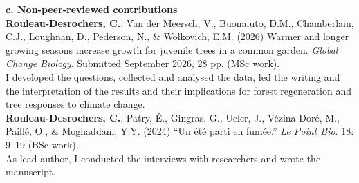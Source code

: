 \documentclass[12pt]{article}
\begin{document}
\textbf{c. Non-peer-reviewed contributions} \\[1pt]
\textbf{Rouleau-Desrochers, C.}, Van der Meersch, V., Buonaiuto, D.M., Chamberlain, C.J., Loughnan, D., Pederson, N., \& Wolkovich, E.M. (2026) Warmer and longer growing seasons increase growth for juvenile trees in a common garden. \textit{Global Change Biology}. Submitted September 2026, 28 pp. (MSc work). \\
I developed the questions, collected and analysed the data, led the writing and the interpretation of the results and their implications for forest regeneration and tree responses to climate change. \\[1pt]

\textbf{Rouleau-Desrochers, C.}, Patry, É., Gingras, G., Ucler, J., Vézina-Doré, M., Paillé, O., \& Moghaddam, Y.Y. (2024) ``Un été parti en fumée.'' \textit{Le Point Bio}. 18: 9--19 (BSc work). \\
As lead author, I conducted the interviews with researchers and wrote the manuscript.

\end{document}
